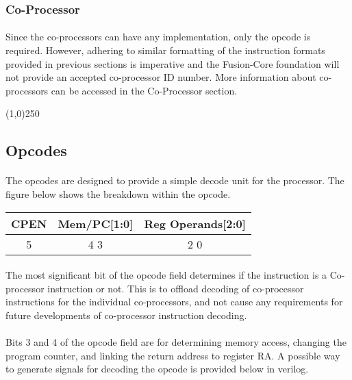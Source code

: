 \documentclass[letterpaper, 11pt]{article}
\begin{document}
\subsubsection{Co-Processor}

\paragraph{}Since the co-processors can have any implementation, only the opcode is required. However, adhering to similar 
formatting of the instruction formats provided in previous sections is imperative and the Fusion-Core foundation 
will not provide an accepted co-processor ID number. More information about co-processors can be accessed in the Co-Processor section.
\begin{center}
	\line(1,0){250}
\end{center}

\newpage
\subsection{Opcodes}
\paragraph{} The opcodes are designed to provide a simple decode unit for the processor. The figure below shows the breakdown
within the opcode.
	\begin{center}
		\begin{tabular}{|c|c|c|}
			\hline
				CPEN & Mem/PC[1:0] & Reg Operands[2:0]	\\ \hline
				5 & 4 \hfill 3 & 2 \hfill 0 \\ \hline

		\end{tabular}
	\end{center}
\paragraph{} The most significant bit of the opcode field determines if the instruction is a Co-processor instruction or not.
This is to offload decoding of co-processor instructions for the individual co-processors, and not cause any requirements
for future developments of co-processor instruction decoding. 
\paragraph{} Bits 3 and 4 of the opcode field are for determining memory access, changing the program counter, and linking
the return address to register RA. A possible way to generate signals for decoding the opcode is provided below in verilog. \\
\end{document}
